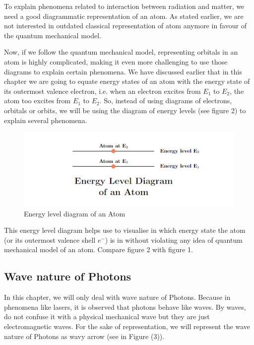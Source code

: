 \documentclass[12pt]{article}
\begin{document}
To explain phenomena related to interaction between radiation and matter, we need a good diagrammatic representation of an atom. As stated earlier, we are not interested in outdated classical representation of atom anymore in favour of the quantum mechanical model. \vspace{.2cm}

Now, if we follow the quantum mechanical model, representing orbitals in an atom is highly complicated, making it even more challenging to use those diagrams to explain certain phenomena. We have discussed earlier that in this chapter we are going to equate energy states of an atom with the energy state of its outermost valence electron, i.e. when an electron excites from $E_{1}$ to $E_{2}$, the atom too excites from $E_{1}$ to $E_{2}$. So, instead of using diagrams of electrons, orbitals or orbits, we will be using the diagram of energy levels (see figure 2) to explain several phenomena.

\begin{figure}[H]
    \centering
    \includegraphics[scale=0.8]{./img/02_energy_levels.png}
    \caption{Energy level diagram of an Atom}
\end{figure}

This energy level diagram helps use to visualise in which energy state the atom (or its outermost valence shell $e^{-}$) is in without violating any idea of quantum mechanical model of an atom. Compare figure 2 with figure 1.

\subsection{Wave nature of Photons}

In this chapter, we will only deal with wave nature of Photons. Because in phenomena like lasers, it is observed that photons behave like waves. By waves, do not confuse it with a physical mechanical wave but they are just electromagnetic waves. For the sake of representation, we will represent the wave nature of Photons as wavy arrow (see in Figure (3)). \vspace{.2cm}
\end{document}
